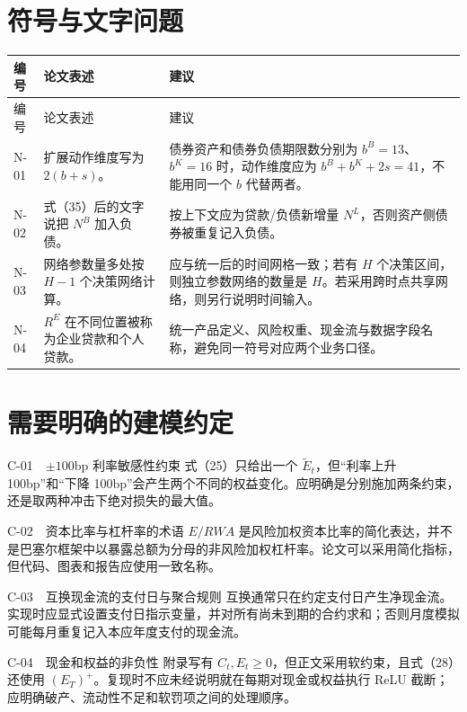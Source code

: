 \documentclass[UTF8,11pt,a4paper,fontset=fandol]{ctexart}
\begin{document}
\section{符号与文字问题}

\begin{longtable}{@{}p{15mm}p{43mm}p{94mm}@{}}
\toprule
编号 & 论文表述 & 建议 \\
\midrule
\endfirsthead
\toprule
编号 & 论文表述 & 建议 \\
\midrule
\endhead
N-01 & 扩展动作维度写为 $2(b+s)$。 & 债券资产和债券负债期限数分别为 $b^B=13$、$b^K=16$ 时，动作维度应为 $b^B+b^K+2s=41$，不能用同一个 $b$ 代替两者。 \\
N-02 & 式（35）后的文字说把 $N^B$ 加入负债。 & 按上下文应为贷款/负债新增量 $N^L$，否则资产侧债券被重复记入负债。 \\
N-03 & 网络参数量多处按 $H-1$ 个决策网络计算。 & 应与统一后的时间网格一致；若有 $H$ 个决策区间，则独立参数网络的数量是 $H$。若采用跨时点共享网络，则另行说明时间输入。 \\
N-04 & $R^E$ 在不同位置被称为企业贷款和个人贷款。 & 统一产品定义、风险权重、现金流与数据字段名称，避免同一符号对应两个业务口径。 \\
\bottomrule
\end{longtable}

\section{需要明确的建模约定}

\begin{fixbox}{C-01　$\pm100$bp 利率敏感性约束}
式（25）只给出一个 $\widetilde E_t$，但“利率上升 100bp”和“下降 100bp”会产生两个不同的权益变化。应明确是分别施加两条约束，还是取两种冲击下绝对损失的最大值。
\end{fixbox}

\begin{fixbox}{C-02　资本比率与杠杆率的术语}
$E/RWA$ 是风险加权资本比率的简化表达，并不是巴塞尔框架中以暴露总额为分母的非风险加权杠杆率。论文可以采用简化指标，但代码、图表和报告应使用一致名称。
\end{fixbox}

\begin{fixbox}{C-03　互换现金流的支付日与聚合规则}
互换通常只在约定支付日产生净现金流。实现时应显式设置支付日指示变量，并对所有尚未到期的合约求和；否则月度模拟可能每月重复记入本应年度支付的现金流。
\end{fixbox}

\begin{fixbox}{C-04　现金和权益的非负性}
附录写有 $C_t,E_t\ge0$，但正文采用软约束，且式（28）还使用 $(E_T)^+$。复现时不应未经说明就在每期对现金或权益执行 ReLU 截断；应明确破产、流动性不足和软罚项之间的处理顺序。
\end{fixbox}
\end{document}
